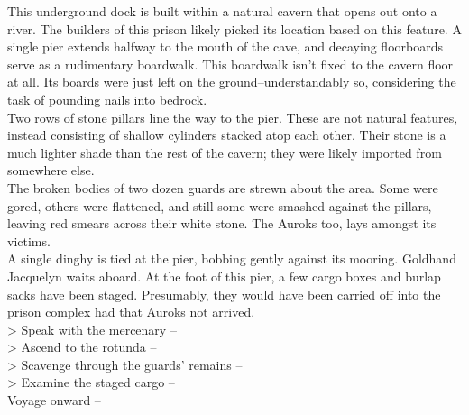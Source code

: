 This underground dock is built within a natural cavern that opens out onto a river. The builders of this prison likely picked its location based on this feature. A single pier extends halfway to the mouth of the cave, and decaying floorboards serve as a rudimentary boardwalk. This boardwalk isn’t fixed to the cavern floor at all. Its boards were just left on the ground--understandably so, considering the task of pounding nails into bedrock.\\

Two rows of stone pillars line the way to the pier. These are not natural features, instead consisting of shallow cylinders stacked atop each other. Their stone is a much lighter shade than the rest of the cavern; they were likely imported from somewhere else.\\

The broken bodies of two dozen guards are strewn about the area. Some were gored, others were flattened, and still some were smashed against the pillars, leaving red smears across their white stone. The Auroks too, lays amongst its victims.\\

A single dinghy is tied at the pier, bobbing gently against its mooring. Goldhand Jacquelyn waits aboard. At the foot of this pier, a few cargo boxes and burlap sacks have been staged. Presumably, they would have been carried off into the prison complex had that Auroks not arrived.\\

> Speak with the mercenary -- \\
> Ascend to the rotunda -- \\
> Scavenge through the guards’ remains -- \\
> Examine the staged cargo -- \\
 Voyage onward -- 